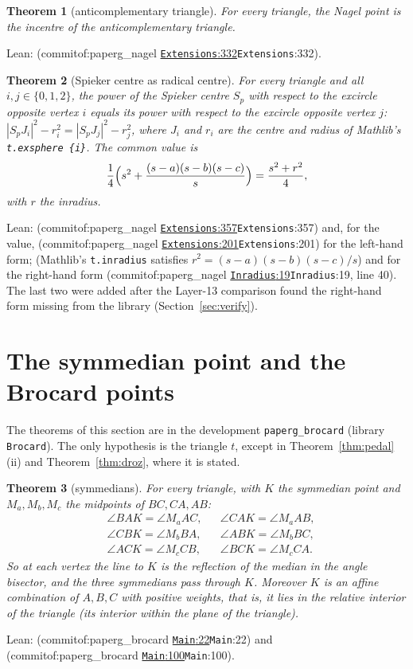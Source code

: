 \documentclass[11pt]{article}
\newtheorem{theorem}{Theorem}
\theoremstyle{definition}
\theoremstyle{remark}
\newcommand{\lean}[1]{\texttt{#1}}
\newcommand{\commitof}[1]{\csname commitof:#1\endcsname}
\newcommand{\repo}[1]{https://github.com/jpbald93/#1}
\newcommand{\src}[4]{\ifcsname commitof:#1\endcsname
  \href{\repo{#1}/blob/\commitof{#1}/#2/#3.lean\#L#4}{\texttt{#3}:#4}\else\texttt{#3}:#4\fi}
\begin{document}
\begin{theorem}[anticomplementary triangle]\label{thm:anti}
For every triangle, the Nagel point is the incentre of the anticomplementary triangle.
\end{theorem}
Lean: 
(\src{paperg_nagel}{NagelLine}{Extensions}{332}).

\begin{theorem}[Spieker centre as radical centre]\label{thm:radical}
For every triangle and all $i,j\in\{0,1,2\}$, the power of the Spieker centre $S_p$ with respect to
the excircle opposite vertex $i$ equals its power with respect to the excircle opposite vertex $j$:
$|S_pJ_i|^2-r_i^2=|S_pJ_j|^2-r_j^2$, where $J_i$ and $r_i$ are the centre and radius of Mathlib's
\lean{t.exsphere \{i\}}. The common value is
\[
\frac14\Bigl(s^2+\frac{(s-a)(s-b)(s-c)}{s}\Bigr)=\frac{s^2+r^2}{4},
\]
with $r$ the inradius.
\end{theorem}
Lean:  (\src{paperg_nagel}{NagelLine}{Extensions}{357})
and, for the value, 
(\src{paperg_nagel}{NagelLine}{Extensions}{201}) for the left-hand form;
 (Mathlib's \lean{t.inradius} satisfies $r^2=(s-a)(s-b)(s-c)/s$) and
 for the right-hand form
(\src{paperg_nagel}{NagelLine}{Inradius}{19}, line 40). The last two were added after the Layer-13 comparison
found the right-hand form missing from the library (Section~\ref{sec:verify}).

\section{The symmedian point and the Brocard points}\label{sec:brocard}
The theorems of this section are in the development \lean{paperg\_brocard} (library
\lean{Brocard}). The only hypothesis is the triangle $t$, except in Theorem~\ref{thm:pedal}(ii) and
Theorem~\ref{thm:droz}, where it is stated.

\begin{theorem}[symmedians]\label{thm:symmedian}
For every triangle, with $K$ the symmedian point and $M_a,M_b,M_c$ the midpoints of $BC,CA,AB$:
\[
\begin{aligned}
&\angle BAK=\angle M_aAC,&& \angle CAK=\angle M_aAB,\\
&\angle CBK=\angle M_bBA,&& \angle ABK=\angle M_bBC,\\
&\angle ACK=\angle M_cCB,&& \angle BCK=\angle M_cCA.
\end{aligned}
\]
So at each vertex the line to $K$ is the reflection of the median in the angle bisector, and the
three symmedians pass through $K$. Moreover $K$ is an affine combination of $A,B,C$ with positive
weights, that is, it lies in the relative interior of the triangle (its interior within the plane
of the triangle).
\end{theorem}
Lean:  (\src{paperg_brocard}{Brocard}{Main}{22}) and
 (\src{paperg_brocard}{Brocard}{Main}{100}).
\end{document}

